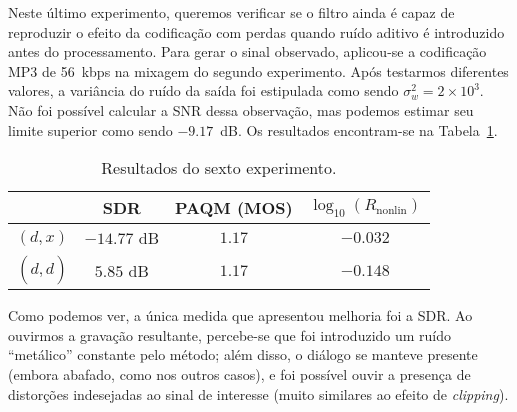 Neste último experimento, queremos verificar se o filtro ainda é capaz de reproduzir o
efeito da codificação com perdas quando ruído aditivo é introduzido antes do
processamento. Para gerar o sinal observado, aplicou-se a codificação MP3 de 56~kbps na
mixagem do segundo experimento. Após testarmos diferentes valores, a variância do ruído
da saída foi estipulada como sendo $\sigma_w^2 = 2 \times 10^{3}$. Não foi possível
calcular a SNR dessa observação, mas podemos estimar seu limite superior como sendo
$-9.17$~dB. Os resultados encontram-se na Tabela~\ref{tab:unscented:experiment-6}.
{\def\arraystretch{1.25}\tabcolsep=10pt
\begin{table}[!ht]
	\centering
	\caption[Resultados do sexto experimento: \textit{fades} com ruído aditivo e codificação com perdas]{Resultados do sexto experimento.}
	\label{tab:unscented:experiment-6}
	\begin{tabular}{cccc}
		\toprule
		               & SDR         & PAQM (MOS) & $\log_{10}(R_{\text{nonlin}})$ \\
		\midrule
		$(d, x)$       & $-14.77$ dB & $1.17$     & $-0.032$                       \\
		$(d, \hat{d})$ & $5.85$ dB   & $1.17$     & $-0.148$                       \\ \bottomrule
	\end{tabular}
\end{table}
}

Como podemos ver, a única medida que apresentou melhoria foi a SDR. Ao ouvirmos a
gravação resultante, percebe-se que foi introduzido um ruído ``metálico'' constante
pelo método; além disso, o diálogo se manteve presente (embora abafado, como nos outros
casos), e foi possível ouvir a presença de distorções indesejadas ao sinal de interesse
(muito similares ao efeito de \textit{clipping}).
